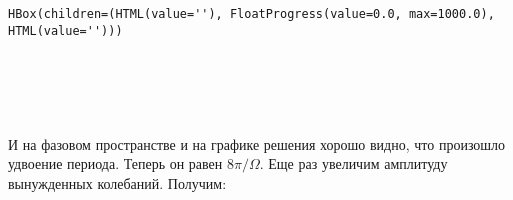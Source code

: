 \documentclass[11pt]{article}
\begin{document}
    
    \begin{Verbatim}[commandchars=\\\{\}]
HBox(children=(HTML(value=''), FloatProgress(value=0.0, max=1000.0), HTML(value='')))
    \end{Verbatim}

    
    \begin{Verbatim}[commandchars=\\\{\}]

    \end{Verbatim}

    \begin{center}
    \end{center}
    { \hspace*{\fill} \\}
    
    \begin{center}
    \end{center}
    { \hspace*{\fill} \\}
    
    И на фазовом пространстве и на графике решения хорошо видно, что
произошло удвоение периода. Теперь он равен \(8 \pi / \Omega\). Еще раз
увеличим амплитуду вынужденных колебаний. Получим:
\end{document}
